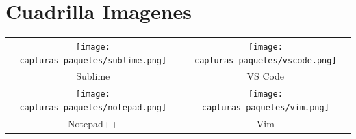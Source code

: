 \documentclass{article}
\begin{document}
\section{Cuadrilla Imagenes}
    \begin{tabular}{cc}
        \texttt{[image: capturas\_paquetes/sublime.png]} & \texttt{[image: capturas\_paquetes/vscode.png]} \\
        Sublime & VS Code \\
        \texttt{[image: capturas\_paquetes/notepad.png]} & \texttt{[image: capturas\_paquetes/vim.png]} \\
        Notepad++ & Vim \\
    \end{tabular}

		
	
\end{document}
